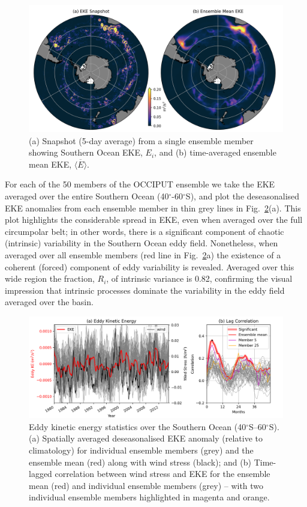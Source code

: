 \documentclass[linenumbers]{agujournal2019}
\begin{document}
\begin{figure}[ht]
\begin{center}
\includegraphics[width=\hsize]{Figure1}
\caption{(a) Snapshot (5-day average) from a single ensemble member showing Southern Ocean EKE, $E_i$, and (b) time-averaged ensemble mean EKE, $\overline{\langle E \rangle}$.}
\label{Fig:1}
\end{center}
\end{figure}

For each of the 50 members of the OCCIPUT ensemble we take the EKE averaged over the entire Southern Ocean (40$^\circ$-60$^\circ$S), and plot the deseasonalised EKE anomalies from each ensemble member in thin grey lines in Fig.~\ref{Fig:2}(a). 
This plot highlights the considerable spread in EKE, even when averaged over the full circumpolar belt; in other words, there is a significant component of chaotic (intrinsic) variability in the Southern Ocean eddy field.
Nonetheless, when averaged over all ensemble members (red line in Fig.~\ref{Fig:2}a) the existence of a coherent (forced) component of eddy variability is revealed.
Averaged over this wide region the fraction, $R_i$, of intrinsic variance is 0.82, confirming the visual impression that intrinsic processes dominate the variability in the eddy field averaged over the basin.

\begin{figure}[t]
\begin{center}
\includegraphics[width=\hsize]{Figure2}
\caption{Eddy kinetic energy statistics over the Southern Ocean (40$^\circ$S--60$^\circ$S). (a) Spatially averaged deseasonalised EKE anomaly (relative to climatology) for individual ensemble members (grey) and the ensemble mean (red) along with wind stress (black); and (b) Time-lagged correlation between wind stress and EKE for the ensemble mean (red) and individual ensemble  members (grey) -- with two individual ensemble members highlighted in magenta and orange.}
\label{Fig:2}
\end{center}
\end{figure}
\end{document}
